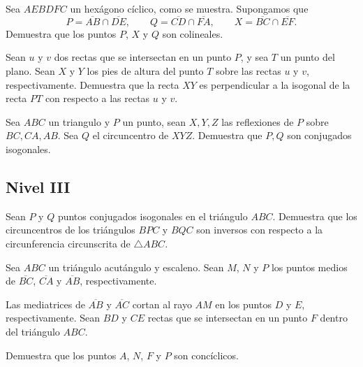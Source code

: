 \documentclass[11pt]{scrartcl}
\begin{document}
\begin{problem} %
Sea $AEBDFC$ un hexágono cíclico, como se muestra. Supongamos que 
\[
P = \overline{AB} \cap \overline{DE}, \qquad
Q = \overline{CD} \cap \overline{FA}, \qquad
X = \overline{BC} \cap \overline{EF}.
\]
Demuestra que los puntos $P$, $X$ y $Q$ son colineales.
\end{problem}




\begin{problem}
     Sean $u$ y $v$ dos rectas que se intersectan en un punto $P$, y sea $T$ un punto del plano.  
 Sean $X$ y $Y$ los pies de altura del punto $T$ sobre las rectas $u$ y $v$, respectivamente.  
Demuestra que la recta $XY$ es perpendicular a la isogonal de la recta $PT$ con respecto a las rectas $u$ y $v$.

\end{problem}

\begin{problem}
    Sea $ABC$ un triangulo y $P$ un punto, sean $X,Y,Z$ las reflexiones de $P$ sobre $BC,CA,AB$. Sea $Q$ el circuncentro de $XYZ$. Demuestra que $P,Q$ son conjugados isogonales.
\end{problem}

\subsection{Nivel III}
\begin{problem}
Sean $P$ y $Q$ puntos conjugados isogonales en el triángulo $ABC$. 
Demuestra que los circuncentros de los triángulos $BPC$ y $BQC$ son inversos con 
respecto a la circunferencia circunscrita de $\triangle ABC$.
\end{problem}


\begin{problem} %
     Sea $ABC$ un triángulo acutángulo y escaleno. Sean $M$, $N$ y $P$ los puntos medios de $\overline{BC}$, $\overline{CA}$ y $\overline{AB}$, respectivamente.  

Las mediatrices de $\overline{AB}$ y $\overline{AC}$ cortan al rayo $AM$ en los puntos $D$ y $E$, respectivamente. Sean $BD$ y $CE$ rectas que se intersectan en un punto $F$ dentro del triángulo $ABC$.  

Demuestra que los puntos $A$, $N$, $F$ y $P$ son concíclicos.
\end{problem}
\end{document}
